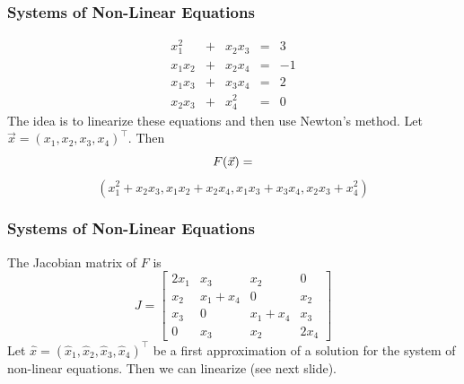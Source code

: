 \documentclass[xcolor=dvipsnames]{beamer}
\begin{document}
\begin{frame}
  \frametitle{Systems of Non-Linear Equations}
  \begin{equation}
    \label{eq:ahxeemei}
    \begin{array}{ccccc}
x_{1}^{2}         & + & x_{2}x_{3} & = & 3    \\
x_{1}x_{2}        & + & x_{2}x_{4} & = & -1   \\
x_{1}x_{3}        & + & x_{3}x_{4} & = & 2    \\
x_{2}x_{3}        & + & x_{4}^{2}  & = & 0
    \end{array}
  \end{equation}
The idea is to linearize these equations and then use Newton's method.
Let $\vec{x}=(x_{1},x_{2},x_{3},x_{4})^{\intercal}$. Then
\begin{equation}
  \label{eq:ocheevoh}
F(\vec{x})=\notag
\end{equation}
\begin{equation}
  \label{eq:ungaedei}
(x_{1}^{2}+x_{2}x_{3},x_{1}x_{2}+x_{2}x_{4},x_{1}x_{3}+x_{3}x_{4},x_{2}x_{3}+x_{4}^{2})
\end{equation}
\end{frame}

\begin{frame}
  \frametitle{Systems of Non-Linear Equations}
The Jacobian matrix of $F$ is
  \begin{equation}
    \label{eq:ahghajee}
    J=\left[
      \begin{array}{cccc}
2x_{1} & x_{3}       & x_{2}       & 0     \\
x_{2}  & x_{1}+x_{4} & 0           & x_{2} \\
x_{3}  & 0           & x_{1}+x_{4} & x_{3} \\
0      & x_{3}       & x_{2}       & 2x_{4}
      \end{array}\right]
  \end{equation}
Let
$\hat{x}=(\hat{x}_{1},\hat{x}_{2},\hat{x}_{3},\hat{x}_{4})^{\intercal}$
be a first approximation of a solution for the system of non-linear
equations. Then we can linearize (see next slide).
\end{frame}
\end{document}
